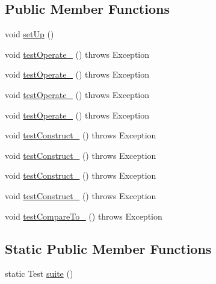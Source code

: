 \subsection*{Public Member Functions}
\begin{DoxyCompactItemize}
\item 
void \hyperlink{classorg_1_1jgap_1_1impl_1_1_gaussian_mutation_operator_test_a150a9d2bc64630a96d5ce8e531abe62f}{set\-Up} ()
\item 
void \hyperlink{classorg_1_1jgap_1_1impl_1_1_gaussian_mutation_operator_test_a5c6d5f1a5c3c12738dd2929e297b1404}{test\-Operate\-\_} ()  throws Exception 
\item 
void \hyperlink{classorg_1_1jgap_1_1impl_1_1_gaussian_mutation_operator_test_a046e6bf1c9541c2a728d457db08f29be}{test\-Operate\-\_} ()  throws Exception 
\item 
void \hyperlink{classorg_1_1jgap_1_1impl_1_1_gaussian_mutation_operator_test_a1e3b4fcc8a28caac10c7a309d5429b58}{test\-Operate\-\_} ()  throws Exception 
\item 
void \hyperlink{classorg_1_1jgap_1_1impl_1_1_gaussian_mutation_operator_test_a2b60af82996d619aed06ee0e6aee9767}{test\-Operate\-\_} ()  throws Exception 
\item 
void \hyperlink{classorg_1_1jgap_1_1impl_1_1_gaussian_mutation_operator_test_a3469919ac7ac94e787e6c2cedf86e71c}{test\-Construct\-\_} ()  throws Exception 
\item 
void \hyperlink{classorg_1_1jgap_1_1impl_1_1_gaussian_mutation_operator_test_aeaaeed648c16532d6e17557110207bf9}{test\-Construct\-\_} ()  throws Exception 
\item 
void \hyperlink{classorg_1_1jgap_1_1impl_1_1_gaussian_mutation_operator_test_afc367be1c9c30f2fe686eabec903f2ef}{test\-Construct\-\_} ()  throws Exception 
\item 
void \hyperlink{classorg_1_1jgap_1_1impl_1_1_gaussian_mutation_operator_test_a9134d15917cdafb3fb702ff41eaa9c1f}{test\-Construct\-\_} ()  throws Exception 
\item 
void \hyperlink{classorg_1_1jgap_1_1impl_1_1_gaussian_mutation_operator_test_a445259ddc4e0b593b3baeca58a4bb824}{test\-Compare\-To\-\_} ()  throws Exception 
\end{DoxyCompactItemize}
\subsection*{Static Public Member Functions}
\begin{DoxyCompactItemize}
\item 
static Test \hyperlink{classorg_1_1jgap_1_1impl_1_1_gaussian_mutation_operator_test_a9053ca1a42094120dc3b3b488da1789c}{suite} ()
\end{DoxyCompactItemize}
